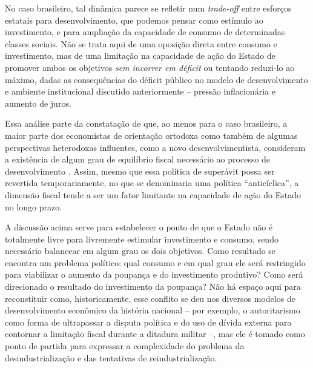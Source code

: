 No caso brasileiro, tal dinâmica parece se refletir num \emph{trade-off}
entre esforços estatais para desenvolvimento, que podemos pensar como
estímulo ao investimento, e para ampliação da capacidade de consumo de
determinadas classes sociais. Não se trata aqui de uma oposição direta
entre consumo e investimento, mas de uma limitação na capacidade de ação
do Estado de promover ambos os objetivos \emph{sem incorrer em déficit}
ou tentando reduzi-lo ao máximo, dadas as consequências do déficit
público no modelo de desenvolvimento e ambiente institucional discutido
anteriormente -- pressão inflacionária e aumento de juros.

Essa análise parte da constatação de que, ao menos para o caso
brasileiro, a maior parte dos economistas de orientação ortodoxa como
também de algumas perspectivas heterodoxas influentes, como a novo
desenvolvimentista, consideram a existência de algum grau de equilíbrio
fiscal necessário ao processo de desenvolvimento . Assim, mesmo que essa política de superávit possa ser revertida
temporariamente, no que se denominaria uma política ``anticíclica'', a
dimensão fiscal tende a ser um fator limitante na capacidade de ação do
Estado no longo prazo.

A discussão acima serve para estabelecer o ponto de que o Estado não é
totalmente livre para livremente estimular investimento e consumo, sendo
necessário balancear em algum grau os dois objetivos. Como resultado se
encontra um problema político: qual consumo e em qual grau ele será
restringido para viabilizar o aumento da poupança e do investimento
produtivo? Como será direcionado o resultado do investimento da
poupança? Não há espaço aqui para reconstituir como, historicamente,
esse conflito se deu nos diversos modelos de desenvolvimento econômico
da história nacional -- por exemplo, o autoritarismo como forma de
ultrapassar a disputa política e do uso de dívida externa para contornar
a limitação fiscal durante a ditadura militar --, mas ele é tomado como
ponto de partida para expressar a complexidade do problema da
desindustrialização e das tentativas de reindustrialização.

